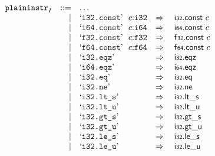 \vspace{1ex}

$$
\begin{array}[t]{@{}lrrl@{}l@{}l@{}l@{}}
& {{\mathtt{plaininstr}}}_{I} & ::= & \dots \\
& & | & \mbox{‘\texttt{i32.const}’}~~c{:}{\mathtt{i32}} & \quad\Rightarrow\quad{} & \mathsf{i{\scriptstyle 32}}{.}\mathsf{const}~c \\
& & | & \mbox{‘\texttt{i64.const}’}~~c{:}{\mathtt{i64}} & \quad\Rightarrow\quad{} & \mathsf{i{\scriptstyle 64}}{.}\mathsf{const}~c \\
& & | & \mbox{‘\texttt{f32.const}’}~~c{:}{\mathtt{f32}} & \quad\Rightarrow\quad{} & \mathsf{f{\scriptstyle 32}}{.}\mathsf{const}~c \\
& & | & \mbox{‘\texttt{f64.const}’}~~c{:}{\mathtt{f64}} & \quad\Rightarrow\quad{} & \mathsf{f{\scriptstyle 64}}{.}\mathsf{const}~c \\
& & | & \mbox{‘\texttt{i32.eqz}’} & \quad\Rightarrow\quad{} & \mathsf{i{\scriptstyle 32}} {.} \mathsf{eqz} \\
& & | & \mbox{‘\texttt{i64.eqz}’} & \quad\Rightarrow\quad{} & \mathsf{i{\scriptstyle 64}} {.} \mathsf{eqz} \\
& & | & \mbox{‘\texttt{i32.eq}’} & \quad\Rightarrow\quad{} & \mathsf{i{\scriptstyle 32}} {.} \mathsf{eq} \\
& & | & \mbox{‘\texttt{i32.ne}’} & \quad\Rightarrow\quad{} & \mathsf{i{\scriptstyle 32}} {.} \mathsf{ne} \\
& & | & \mbox{‘\texttt{i32.lt\_s}’} & \quad\Rightarrow\quad{} & \mathsf{i{\scriptstyle 32}} {.} {\mathsf{lt}}{\mathsf{\_}}{\mathsf{s}} \\
& & | & \mbox{‘\texttt{i32.lt\_u}’} & \quad\Rightarrow\quad{} & \mathsf{i{\scriptstyle 32}} {.} {\mathsf{lt}}{\mathsf{\_}}{\mathsf{u}} \\
& & | & \mbox{‘\texttt{i32.gt\_s}’} & \quad\Rightarrow\quad{} & \mathsf{i{\scriptstyle 32}} {.} {\mathsf{gt}}{\mathsf{\_}}{\mathsf{s}} \\
& & | & \mbox{‘\texttt{i32.gt\_u}’} & \quad\Rightarrow\quad{} & \mathsf{i{\scriptstyle 32}} {.} {\mathsf{gt}}{\mathsf{\_}}{\mathsf{u}} \\
& & | & \mbox{‘\texttt{i32.le\_s}’} & \quad\Rightarrow\quad{} & \mathsf{i{\scriptstyle 32}} {.} {\mathsf{le}}{\mathsf{\_}}{\mathsf{s}} \\
& & | & \mbox{‘\texttt{i32.le\_u}’} & \quad\Rightarrow\quad{} & \mathsf{i{\scriptstyle 32}} {.} {\mathsf{le}}{\mathsf{\_}}{\mathsf{u}} \\

\end{array}$$
